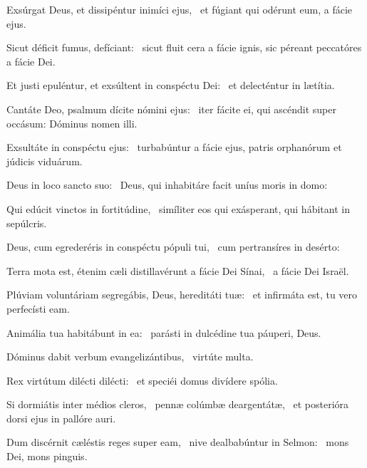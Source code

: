 \item Exsúrgat Deus, et dissipéntur inimíci ejus,~\psstar{} et fúgiant qui odérunt eum, a fácie ejus.

\item Sicut déficit fumus, defí\-ciant:~\psstar{} sicut fluit cera a fácie ignis, sic péreant peccatóres a fácie Dei.

\item Et justi epuléntur, et exsúltent in conspéctu Dei:~\psstar{} et delecténtur in lætítia.

\item Cantáte Deo, psalmum dícite nómini ejus:~\psstar{} iter fácite ei, qui ascéndit super occásum: Dóminus nomen illi.

\item Exsultáte in conspéctu ejus:~\psstar{} turbabúntur a fácie ejus, patris orphanórum et júdicis viduárum.

\item Deus in loco sancto suo:~\psstar{} Deus, qui inhabitáre facit uníus moris in domo:

\item Qui edúcit vinctos in fortitúdine,~\psstar{} simíliter eos qui exásperant, qui hábitant in sepúlcris.

\item Deus, cum egrederéris in conspéctu pópuli tui,~\psstar{} cum pertransíres in desérto:

\item Terra mota est, étenim cæli distillavérunt a fácie Dei Sínai,~\psstar{} a fácie Dei Israël.

\item Plúviam voluntáriam segregábis, Deus, hereditáti tuæ:~\psstar{} et infirmáta est, tu vero perfecísti eam.

\item Animália tua habitábunt in ea:~\psstar{} parásti in dulcédine tua páuperi, Deus.

\item Dóminus dabit verbum evangelizántibus,~\psstar{} virtúte multa.

\item Rex virtútum dilécti dilécti:~\psstar{} et speciéi domus divídere spólia.

\item Si dormiátis inter médios cleros,~\pscross{} pennæ colúmbæ deargentátæ,~\psstar{} et posterióra dorsi ejus in pallóre auri.

\item Dum discérnit cæléstis reges super eam,~\pscross{} nive dealbabúntur in Selmon:~\psstar{} mons Dei, mons pinguis.

